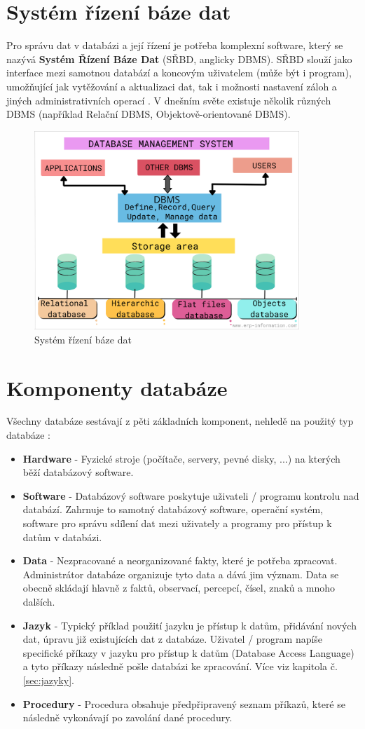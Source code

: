 \section{Systém řízení báze dat}
Pro správu dat v databázi a její řízení je potřeba komplexní software, který se nazývá \textbf{Systém Řízení Báze Dat} (SŘBD, anglicky \gls{DBMS}). SŘBD slouží jako interface mezi samotnou databází a koncovým uživatelem (může být i program), umožňující jak vytěžování a aktualizaci dat, tak i možnosti nastavení záloh a jiných administrativních operací \cite{OracleDB}. V dnešním světe existuje několik různých \gls{DBMS} (například Relační \gls{DBMS}, Objektově-orientované \gls{DBMS}).
\begin{figure}[h!]
\centering
\includegraphics[width=10cm]{img/databaze/dbms}
\caption{Systém řízení báze dat}
\label{fig:dbms}
\end{figure}

\section{Komponenty databáze}
Všechny databáze sestávají z pěti základních komponent, nehledě na použitý typ databáze \cite{TechTargetDB, guru99Database}:
\begin{itemize}
\item \textbf{Hardware} - Fyzické stroje (počítače, servery, pevné disky, ...) na kterých běží databázový software.
\item \textbf{Software} - Databázový software poskytuje uživateli / programu kontrolu nad databází. Zahrnuje to samotný databázový software, operační systém, software pro správu sdílení dat mezi uživately a programy pro přístup k datům v databázi.
\item \textbf{Data} - Nezpracované a neorganizované fakty, které je potřeba zpracovat. Administrátor databáze organizuje tyto data a dává jim význam. Data se obecně skládají hlavně z faktů, observací, percepcí, čísel, znaků a mnoho dalších.
\item \textbf{Jazyk} - Typický příklad použití jazyku je přístup k datům, přidávání nových dat, úpravu již existujících dat z databáze. Uživatel / program napíše specifické příkazy v jazyku pro přístup k datům (Database Access Language) a tyto příkazy následně pošle databázi ke zpracování. Více viz kapitola č. \ref{sec:jazyky}.
\item \textbf{Procedury} - Procedura obsahuje předpřipravený seznam příkazů, které se následně vykonávají po zavolání dané procedury. 
\end{itemize}

